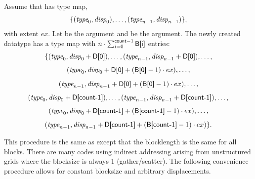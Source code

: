 Assume that  has type map,
\begin{displaymath}
\{ (\textrm{\itshape{type}}_0,\textrm{\itshape{disp}}_0), \ldots, (\textrm{\itshape{type}}_{n-1}, \textrm{\itshape{disp}}_{n-1}) \} ,
\end{displaymath}
with extent $ex$.
Let  be the  argument and
 be the
 argument. The newly created datatype
has a type map with
$n \cdot \sum_{i=0}^{\mscode{count}-1}
\mpiarg{B[i]}$ entries:
\begin{displaymath}
\{
(\mword{type}_0, \mword{disp}_0 + \mpiarg{D[0]}  ) , \ldots ,
(\mword{type}_{n-1} , \mword{disp}_{n-1} + \mpiarg{D[0]} ) , \ldots ,
\end{displaymath}
\begin{displaymath}
(\mword{type}_0 , \mword{disp}_0 + \mpiarg{D[0]} +(\mpiarg{B[0]} -1) \cdot ex) ,\ldots,
\end{displaymath}
\begin{displaymath}
(\mword{type}_{n-1} , \mword{disp}_{n-1} + \mpiarg{D[0]} +(\mpiarg{B[0]} -1) \cdot ex ) ,
\ldots,
\end{displaymath}
\begin{displaymath}
(\mword{type}_0, \mword{disp}_0 + \mpiarg{D[count-1]} ) , \ldots ,
(\mword{type}_{n-1} , \mword{disp}_{n-1} + \mpiarg{D[count-1]} ) , \ldots ,
\end{displaymath}
\begin{displaymath}
(\mword{type}_0 , \mword{disp}_0 + \mpiarg{D[count-1]} +(\mpiarg{B[count-1]} -1) \cdot ex)
,\ldots,
\end{displaymath}
\begin{displaymath}
(\mword{type}_{n-1} , \mword{disp}_{n-1} + \mpiarg{D[count-1]} +(\mpiarg{B[count-1]} -1)
\cdot ex )
\} .
\end{displaymath}

This procedure is the same as  except that the
blocklength is the same for all blocks.
There are many codes using indirect addressing arising from
unstructured grids where the blocksize is always 1 (gather/scatter).  The
following convenience procedure allows for constant blocksize and arbitrary
displacements.


